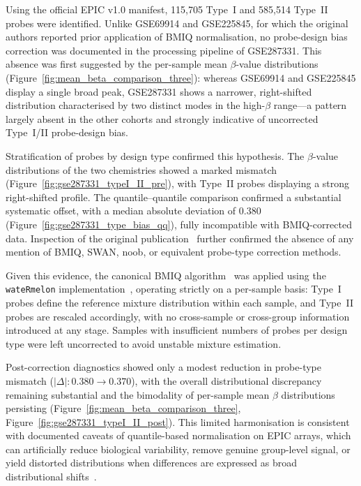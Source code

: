 Using the official EPIC v1.0 manifest, 115{,}705 Type~I and 585{,}514 Type~II
probes were identified. Unlike GSE69914 and GSE225845, for which the original
authors reported prior application of BMIQ normalisation, no probe-design bias
correction was documented in the processing pipeline of GSE287331. This absence
was first suggested by the per-sample mean $\beta$-value distributions
(Figure~\ref{fig:mean_beta_comparison_three}): whereas GSE69914 and GSE225845
display a single broad peak, GSE287331 shows a narrower, right-shifted
distribution characterised by two distinct modes in the high-$\beta$ range---a
pattern largely absent in the other cohorts and strongly indicative of uncorrected
Type~I/II probe-design bias.

Stratification of probes by design type confirmed this hypothesis. The
$\beta$-value distributions of the two chemistries showed a marked mismatch
(Figure~\ref{fig:gse287331_typeI_II_pre}), with Type~II probes displaying a
strong right-shifted profile. The quantile--quantile comparison confirmed a
substantial systematic offset, with a median absolute deviation of $0.380$
(Figure~\ref{fig:gse287331_type_bias_qq}), fully incompatible with BMIQ-corrected
data. Inspection of the original publication~\cite{Lord2024GSE287331} further
confirmed the absence of any mention of BMIQ, SWAN, noob, or equivalent
probe-type correction methods.

Given this evidence, the canonical BMIQ algorithm~\cite{Teschendorff2013BMIQ}
was applied using the \texttt{wateRmelon} implementation~\cite{Pidsley2013wateRmelon},
operating strictly on a per-sample basis: Type~I probes define the reference
mixture distribution within each sample, and Type~II probes are rescaled
accordingly, with no cross-sample or cross-group information introduced at any
stage. Samples with insufficient numbers of probes per design type were left
uncorrected to avoid unstable mixture estimation.

Post-correction diagnostics showed only a modest reduction in probe-type mismatch
($|\Delta| : 0.380 \rightarrow 0.370$), with the overall distributional discrepancy
remaining substantial and the bimodality of per-sample mean $\beta$ distributions
persisting (Figure~\ref{fig:mean_beta_comparison_three},
Figure~\ref{fig:gse287331_typeI_II_post}). This limited harmonisation is consistent
with documented caveats of quantile-based normalisation on EPIC arrays, which can
artificially reduce biological variability, remove genuine group-level signal, or
yield distorted distributions when differences are expressed as broad distributional
shifts~\cite{Welsh2023EPICnorm, Yousefi2013Normalization, Liu2016Processing}.

